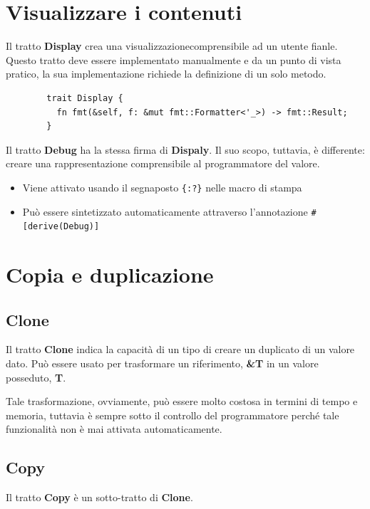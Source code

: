 \section{Visualizzare i contenuti}

Il tratto \textbf{Display} crea una visualizzazionecomprensibile ad un utente fianle.
Questo tratto deve essere implementato manualmente e da un punto di vista pratico,
la sua implementazione richiede la definizione di un solo metodo.

\begin{verbatim}
        trait Display {
          fn fmt(&self, f: &mut fmt::Formatter<'_>) -> fmt::Result;
        }
\end{verbatim}

Il tratto \textbf{Debug} ha la stessa firma di \textbf{Dispaly}. Il suo scopo,
tuttavia, è differente: creare una rappresentazione comprensibile al
programmatore del valore.

\begin{itemize}
  \item Viene attivato usando il segnaposto \verb|{:?}| nelle macro di stampa
  \item Può essere sintetizzato automaticamente attraverso l'annotazione \verb|#[derive(Debug)]|
\end{itemize}

\section{Copia e duplicazione}

\subsection{Clone}

Il tratto \textbf{Clone} indica la capacità di un tipo di creare un duplicato di un
valore dato.
Può essere usato per trasformare un riferimento, \textbf{\&T} in un valore
posseduto, \textbf{T}.

Tale trasformazione, ovviamente, può essere molto costosa in termini di tempo e
memoria, tuttavia è sempre sotto il controllo del programmatore perché tale
funzionalità non è mai attivata automaticamente.

\subsection{Copy}

Il tratto \textbf{Copy} è un sotto-tratto di \textbf{Clone}.

